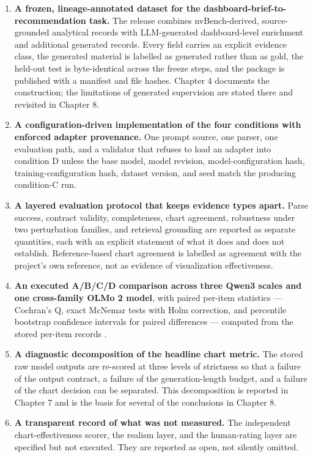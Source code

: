 \begin{enumerate}
\def\labelenumi{\arabic{enumi}.}
\item
  \textbf{A frozen, lineage-annotated dataset for the dashboard-brief-to-recommendation task.} The release combines nvBench-derived, source-grounded analytical records with LLM-generated dashboard-level enrichment and additional generated records. Every field carries an explicit evidence class, the generated material is labelled as generated rather than as gold, the held-out test is byte-identical across the freeze steps, and the package is published with a manifest and file hashes. Chapter 4 documents the construction; the limitations of generated supervision are stated there and revisited in Chapter 8.
\item
  \textbf{A configuration-driven implementation of the four conditions with enforced adapter provenance.} One prompt source, one parser, one evaluation path, and a validator that refuses to load an adapter into condition D unless the base model, model revision, model-configuration hash, training-configuration hash, dataset version, and seed match the producing condition-C run.
\item
  \textbf{A layered evaluation protocol that keeps evidence types apart.} Parse success, contract validity, completeness, chart agreement, robustness under two perturbation families, and retrieval grounding are reported as separate quantities, each with an explicit statement of what it does and does not establish. Reference-based chart agreement is labelled as agreement with the project's own reference, not as evidence of visualization effectiveness.
\item
  \textbf{An executed A/B/C/D comparison across three Qwen3 scales and one cross-family OLMo 2 model}, with paired per-item statistics --- Cochran's Q, exact McNemar tests with Holm correction, and percentile bootstrap confidence intervals for paired differences --- computed from the stored per-item records \cite{cochran1950,mcnemar1947,holm1979,efron1979bootstrap}.
\item
  \textbf{A diagnostic decomposition of the headline chart metric.} The stored raw model outputs are re-scored at three levels of strictness so that a failure of the output contract, a failure of the generation-length budget, and a failure of the chart decision can be separated. This decomposition is reported in Chapter 7 and is the basis for several of the conclusions in Chapter 8.
\item
  \textbf{A transparent record of what was not measured.} The independent chart-effectiveness scorer, the realism layer, and the human-rating layer are specified but not executed. They are reported as open, not silently omitted.
\end{enumerate}

